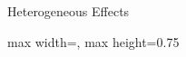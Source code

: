 \begin{frame}{Heterogeneous Effects}
\begin{adjustbox}{max width=\textwidth, max height=0.75\textheight}
% 
\end{adjustbox}
\end{frame}
